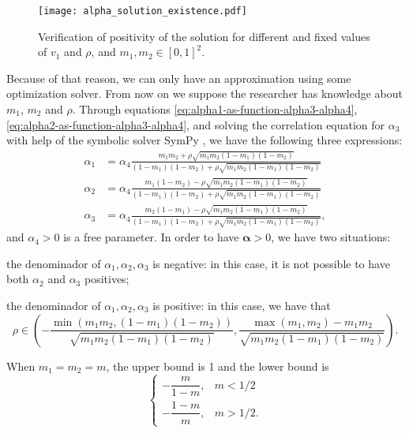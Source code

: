 \begin{figure}[!ht]
    \centering
    \caption{Verification of positivity of the solution for different and
    fixed values of $v_1$ and $\rho$, and $m_1, m_2 \in [0,1]^2$.} 
    \texttt{[image: alpha\_solution\_existence.pdf]}
    \label{fig:alpha-solutions}
\end{figure}

Because of that reason, we can only have an approximation using some
optimization solver. From now on we suppose the researcher has knowledge about
$m_1$, $m_2$ and $\rho$. Through equations
\eqref{eq:alpha1-as-function-alpha3-alpha4}, 
\ref{eq:alpha2-as-function-alpha3-alpha4}, and solving the correlation
equation for $\alpha_3$ with help of the symbolic solver SymPy \cite{sympy},
we have the following three expressions: 
\begin{equation*}
  \begin{aligned}
    \alpha_1 &= \alpha_4\frac{m_1m_2 + \rho\sqrt{m_1m_2(1-m_1)(1-m_2)}}{(1-m_1)(1-m_2) + \rho\sqrt{m_1m_2(1-m_1)(1-m_2)}} \\
    \alpha_2 &= \alpha_4\frac{m_1(1-m_2) - \rho\sqrt{m_1m_2(1-m_1)(1-m_2)}}{(1-m_1)(1-m_2) + \rho\sqrt{m_1m_2(1-m_1)(1-m_2)}} \\
    \alpha_3 &= \alpha_4\frac{m_2(1-m_1) - \rho\sqrt{m_1m_2(1-m_1)(1-m_2)}}{(1-m_1)(1-m_2) + \rho\sqrt{m_1m_2(1-m_1)(1-m_2)}},
  \end{aligned}
\end{equation*}
and $\alpha_4 > 0$ is a free parameter. In order to have $\boldsymbol{\alpha} >
0$, we have two situations:
\begin{alineas}
  \item the denominador of $\alpha_1, \alpha_2, \alpha_3$ is negative: in this
  case, it is not possible to have both $\alpha_2$ and $\alpha_3$ positives;
  \item the denominador of  $\alpha_1, \alpha_2, \alpha_3$ is positive: in
  this case, we have that 
  $$
  \rho \in \left(-\frac{\min(m_1m_2, (1-m_1)(1-m_2))}{\sqrt{m_1m_2(1-m_1)(1-m_2)}}, 
  \frac{\max(m_1, m_2) - m_1m_2}{\sqrt{m_1m_2(1-m_1)(1-m_2)}}\right).
  $$
\end{alineas}

When $m_1 = m_2 = m$, the upper bound is 1 and the lower bound is 
$$\begin{cases}
  -\dfrac{m}{1-m}, &m < 1/2 \\
  -\dfrac{1-m}{m}, &m > 1/2.
\end{cases}$$

